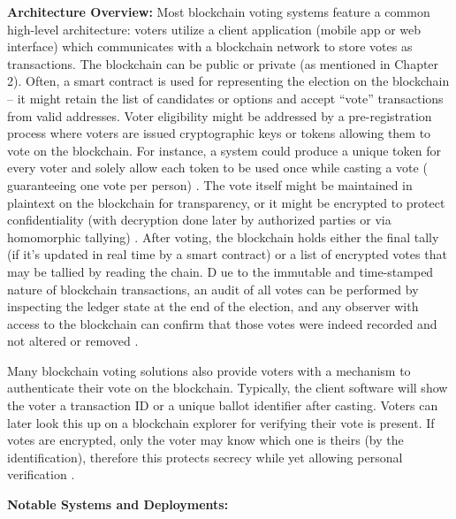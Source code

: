 \documentclass[a4paper,10pt]{report}
\begin{document}
\textbf {Architecture Overview:}  Most blockchain voting systems feature a common high-level architecture: voters utilize a client application (mobile app or web interface) which communicates with a blockchain network to store votes as transactions.  The blockchain can be public or private (as mentioned in Chapter 2).  Often, a smart contract is used for representing the election on the blockchain -- it might retain the list of candidates or options and accept “vote” transactions from valid addresses.  Voter eligibility might be addressed by a pre-registration process where voters are issued cryptographic keys or tokens allowing them to vote on the blockchain.  For instance, a system could produce a unique token for every voter and solely allow each token to be used once while casting a vote ( guaranteeing one vote per person) \cite{narayanan2016bitcoin}.  The vote itself might be maintained in plaintext on the blockchain for transparency, or it might be encrypted to protect confidentiality (with decryption done later by authorized parties or via homomorphic tallying) \cite{bonneau2015sok}.  After voting, the blockchain holds either the final tally (if it’s updated in real time by a smart contract) or a list of encrypted votes that may be tallied by reading the chain. D ue to the immutable and time-stamped nature of blockchain transactions, an audit of all votes can be performed by inspecting the ledger state at the end of the election, and any observer with access to the blockchain can confirm that those votes were indeed recorded and not altered or removed \cite{zhang2019blockchain}.

 Many blockchain voting solutions also provide voters with a mechanism to authenticate their vote on the blockchain.  Typically, the client software will show the voter a transaction ID or a unique ballot identifier after casting.  Voters can later look this up on a blockchain explorer for verifying their vote is present.  If votes are encrypted, only the voter may know which one is theirs (by the identification), therefore this protects secrecy while yet allowing personal verification \cite{bonneau2015sok,chaum2004secret}.

\textbf{Notable Systems and Deployments:}
\end{document}
